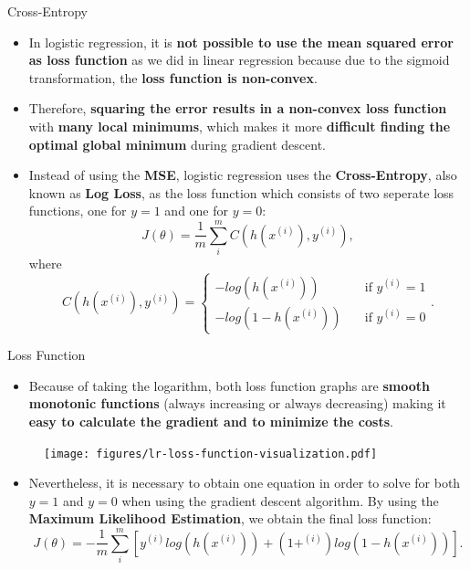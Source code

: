 \documentclass[document.tex]{subfiles}
\begin{document}
    \begin{frame}{Cross-Entropy}
        \begin{itemize}
            \item In logistic regression, it is \textbf{not possible to use the mean squared error as loss function} as we did in linear regression because due to the sigmoid transformation, the \textbf{loss function is non-convex}.
            \item Therefore, \textbf{squaring the error results in a non-convex loss function} with \textbf{many local minimums}, which makes it more \textbf{difficult finding the optimal global minimum} during gradient descent.
            \item Instead of using the \textbf{MSE}, logistic regression uses the \textbf{Cross-Entropy}, also known as \textbf{Log Loss}, as the loss function which consists of two seperate loss functions, one for $y=1$ and one for $y=0$: 
            $$J(\theta)= \frac{1}{m} \sum_{i}^{m} C(h(x^{(i)}), y^{(i)}),$$
            where
            \[ C(h(x^{(i)}), y^{(i)})  =
            \begin{cases}
            -log(h(x^{(i)}))        & \quad \text{if } y^{(i)} = 1 \\
            -log(1 - h(x^{(i)}))    & \quad \text{if } y^{(i)} = 0
            \end{cases}.
            \]
        \end{itemize}
    \end{frame}

	\begin{frame}{Loss Function}
        \begin{itemize}
            \item Because of taking the logarithm, both loss function graphs are \textbf{smooth monotonic functions} (always increasing or always decreasing) making it \textbf{easy to calculate the gradient and to minimize the costs}.
        \end{itemize}
        \begin{figure}
            \label{fig:lr-loss-function-visualization}
            \texttt{[image: figures/lr-loss-function-visualization.pdf]}
        \end{figure}
        \begin{itemize}
            \item Nevertheless, it is necessary to obtain one equation in order to solve for both $y=1$ and $y=0$ when using the gradient descent algorithm. By using the \textbf{Maximum Likelihood Estimation}, we obtain the final loss function:
            $$J(\theta)= -\frac{1}{m} \sum_{i}^{m} [y^{(i)}log(h(x^{(i)})) + 
            (1+^{(i)})log(1 - h(x^{(i)}))].$$
        \end{itemize}
    \end{frame}
\end{document}
